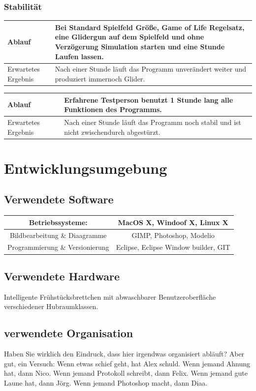 \documentclass[11pt,a4paper]{article}
\begin{document}
\newpage

\subsubsection{Stabilität}

\begin{longtable}[m]{|m{3cm}|m{10cm}|}
\hline
Ablauf&Bei Standard Spielfeld Größe, Game of Life Regelsatz, eine Glidergun auf dem Spielfeld und ohne Verzögerung Simulation starten und eine Stunde Laufen lassen.\\
\hline
Erwartetes Ergebnis&Nach einer Stunde läuft das Programm unverändert weiter und produziert immernoch Glider.\\
\hline
\end{longtable}

\begin{longtable}[m]{|m{3cm}|m{10cm}|}
\hline
Ablauf&Erfahrene Testperson benutzt 1 Stunde lang alle Funktionen des Programms.\\
\hline
Erwartetes Ergebnis&Nach einer Stunde läuft das Programm noch stabil und ist nicht zwischendurch abgestürzt.\\
\hline
\end{longtable}


\section{Entwicklungsumgebung}
\subsection{Verwendete Software}
\begin{tabular}{|c|c|}
\hline
Betriebssysteme:     &  MacOS X, Windoof X, Linux X
  \\
     \hline
     Bildbearbeitung  \&  Diaagramme & 
         GIMP, Photoshop, Modelio
 \\
     \hline
     Programmierung  \& Versionierung & 
          Eclipse, 
          Eclipse Window builder,
          GIT\\
     \hline
\end{tabular}
\subsection{Verwendete Hardware}
Intelligente Frühstücksbrettchen mit abwaschbarer Benutzeroberfläche verschiedener Hubraumklassen.
\subsection{verwendete Organisation}
Haben Sie wirklich den Eindruck, dass hier irgendwas organisiert abläuft? 
Aber gut, ein Versuch: 
Wenn etwas schief geht, hat Alex schuld.
Wenn jemand Ahnung hat, dann Nico.
Wenn jemand Protokoll schreibt, dann Felix.
Wenn jemand gute Laune hat, dann Jörg.
Wenn jemand Photoshop macht, dann Diaa.
\end{document}
